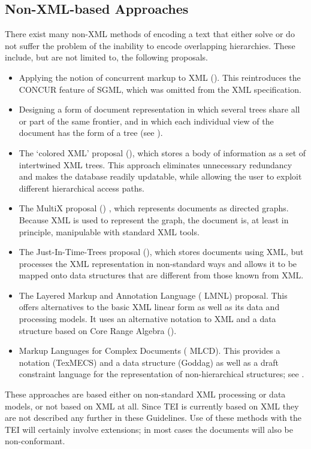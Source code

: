 \subsection[{Non-XML-based Approaches}]{Non-XML-based Approaches}\label{NHNX}\par
There exist many non-XML methods of encoding a text that either solve or do not suffer the problem of the inability to encode overlapping hierarchies. These include, but are not limited to, the following proposals.\begin{itemize}
\item Applying the notion of concurrent markup to XML (\cite{NH-BIBL-2}). This reintroduces the CONCUR feature of SGML, which was omitted from the XML specification.
\item Designing a form of document representation in which several trees share all or part of the same frontier, and in which each individual view of the document has the form of a tree (see \cite{NH-BIBL-3}).
\item The ‘colored XML’ proposal (\cite{NH-BIBL-4}), which stores a body of information as a set of intertwined XML trees. This approach eliminates unnecessary redundancy and makes the database readily updatable, while allowing the user to exploit different hierarchical access paths.
\item The MultiX proposal (\cite{NH-BIBL-5}) , which represents documents as directed graphs. Because XML is used to represent the graph, the document is, at least in principle, manipulable with standard XML tools.
\item The Just-In-Time-Trees proposal (\cite{NH-BIBL-6}), which stores documents using XML, but processes the XML representation in non-standard ways and allows it to be mapped onto data structures that are different from those known from XML.
\item The  {\expan Layered Markup and Annotation Language} ( {\abbr LMNL}) proposal. This offers alternatives to the basic XML linear form as well as its data and processing models. It uses an alternative notation to XML and a data structure based on Core Range Algebra (\cite{NH-BIBL-7}).
\item  {\expan Markup Languages for Complex Documents} ( {\abbr MLCD}). This provides a notation (TexMECS) and a data structure (Goddag) as well as a draft constraint language for the representation of non-hierarchical structures; see \cite{NH-BIBL-8}.
\end{itemize} \par
These approaches are based either on non-standard XML processing or data models, or not based on XML at all. Since TEI is currently based on XML they are not described any further in these Guidelines. Use of these methods with the TEI will certainly involve extensions; in most cases the documents will also be non-conformant.